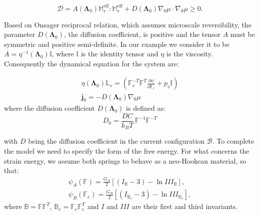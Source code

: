 \documentclass[12pt]{extarticle}
\newcommand{\F}{\ensuremath{\mathbb{F}}}
\newcommand{\B}{\ensuremath{\mathbb{B}}}
\newcommand{\LL}{\ensuremath{\mathbb{L}}}
\newcommand{\Me}{\ensuremath{\mathbb{M}_e^{\text{eff}}}}
\begin{document}
\begin{equation*}
\mathcal{D}= A(\boldsymbol{\Lambda}_0) \Me : \Me  + D(\boldsymbol{\Lambda}_0)\nabla_0 \mu\cdot\nabla_0 \mu\geq 0 .
\end{equation*}

Based on Onsager reciprocal relation, which assumes microscale reversibility, the parameter $D(\boldsymbol{\Lambda}_0)$, the diffusion coefficient, is positive and the tensor $A$ must be symmetric and positive semi-definite. In our example we consider it to be $A=\eta^{-1}(\boldsymbol{\Lambda}_0) \mathbb{I}$, where $\mathbb{I}$ is the identity tensor and $\eta$ is the viscosity. Consequently the dynamical equation for the system are:

\begin{eqnarray}
\eta(\boldsymbol{\Lambda}_0)\LL_v= \left(\F_v^{-T}\F^{T} \frac{\partial \psi}{\partial \F_e}+p_v\mathbb{I}\right)\\
\mathbf{j}_0 = -D(\boldsymbol{\Lambda}_0) \nabla_0 \mu
\end{eqnarray}
where the diffusion coefficient $D(\boldsymbol{\Lambda}_0)$ is defined as:
\begin{equation}
D_0= \frac{DC}{k_BT}\, \F^{-1}\F^{-T}
\end{equation}

with $D$ being the diffusion coefficient in the current configuration $\mathcal{B}$.
To complete the model we need to specify the form of the free energy. For what concerns the strain energy, we assume both springs to behave as a neo-Hookean material, so that:
\begin{equation}
\begin{aligned}
\psi_A(\F) = \frac{G_A}{2} \left[(I_\B-3)-\ln III_\B\right],\\
\psi_B(\F_e) = \frac{G_B}{2} \left[(I_{\B_e}-3)-\ln III_{\B_e}\right],
\end{aligned}
\end{equation}
where $\B=\F\F^T$, $\B_e=\F_e\F_e^T$ and $I$ and $III$ are their first and third invariants.
\end{document}
